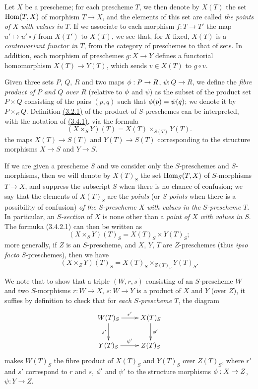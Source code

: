 \begin{env}[3.4.1]
\label{env-1.3.4.1}
Let $X$ be a prescheme; for each prescheme $T$, we then denote by $X(T)$ the set
${\mathop{\mathrm{Hom}}\nolimits}(T,X)$ of morphism $T\to X$, and the elements of this set are called
{\em the points of $X$ with values in $T$}. If we associate to each morphism
$f:T\to T'$ the map $u'\mapsto u'\circ f$ from $X(T')$ to $X(T)$, we see that,
for $X$ fixed, $X(T)$ is a {\em contravariant functor in $T$}, from the
category of preschemes to that of sets. In addition, each morphism of preschemes
$g:X\to Y$ defines a functorial homomorphism $X(T)\to Y(T)$, which sends
$v\in X(T)$ to $g\circ v$.
\end{env}

\begin{env}[3.4.2]
\label{env-1.3.4.2}
Given three sets $P$, $Q$, $R$ and two maps $\phi:P\to R$, $\psi:Q\to R$, we define the
{\em fibre product of $P$ and $Q$ over $R$} (relative to $\phi$ and $\psi$) as the subset
of
the product set $P\times Q$ consisting of the pairs $(p,q)$ such that $\phi(p)=\psi(q)$; we
denote it by $P\times_R Q$. Definition \hyperref[defn-1.3.2.1]{(3.2.1)} of the product
of $S$-preschemes can be interpreted, with the notation of \hyperref[env-1.3.4.1]{(3.4.1)},
via the formula
\[
  (X\times_S Y)(T)=X(T)\times_{S(T)}Y(T).
  \tag{3.4.2.1}
\]
the maps $X(T)\to S(T)$ and $Y(T)\to S(T)$ corresponding to the structure morphisms
$X\to S$ and $Y\to S$.
\end{env}

\begin{env}[3.4.3]
\label{env-1.3.4.3}
If we are given a prescheme $S$ and we consider only the $S$-preschemes and $S$-morphisms,
then we will denote by $X(T)_S$ the set ${\mathop{\mathrm{Hom}}\nolimits}_S(T,X)$ of $S$-morphisms $T\to X$, and suppress
the subscript $S$ when there is no chance of confusion; we say that the elements of $X(T)_S$
are the {\em points} (or {\em $S$-points} when there is a possibility of confusion)
{\em of the $S$-prescheme $X$ with values in the $S$-prescheme $T$}. In particular, an
{\em $S$-section} of $X$ is none other than a {\em point of $X$ with values in $S$}. The
formuka (3.4.2.1) can then be written as
\[
  (X\times_S Y)(T)_S=X(T)_S\times Y(T)_S;
  \tag{3.4.3.1}
\]
more generally, if $Z$ is an $S$-prescheme, and $X$, $Y$, $T$ are $Z$-preschemes (thus
{\em ipso facto} $S$-preschemes), then we have
\[
  (X\times_Z Y)(T)_S=X(T)_S\times_{Z(T)_S}Y(T)_S.
  \tag{3.4.3.2}
\]

We note that to show that a triple $(W,r,s)$ consisting of an $S$-prescheme $W$ and two
$S$-morphisms $r:W\to X$, $s:W\to Y$ is a product of $X$ and $Y$ (over $Z$), it suffies by
definition to check that for {\em each $S$-prescheme $T$}, the diagram
\[
  \xymatrix{
    W(T)_S\ar[r]^{r'}\ar[d]_{s'} &
    X(T)_S\ar[d]^{\vphi'}\\
    Y(T)_S\ar[r]^{\psi'} &
    Z(T)_S
  }
\]
makes $W(T)_S$ the fibre product of $X(T)_S$ and $Y(T)_S$ over $Z(T)_S$, where $r'$ and $s'$
correspond to $r$ and $s$, $\phi'$ and $\psi'$ to the structure morphisms $\phi:X\to Z$,
$\psi:Y\to Z$.
\end{env}

